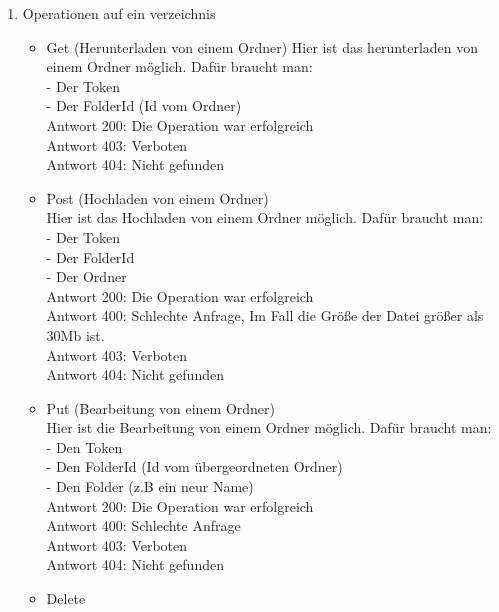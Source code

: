 \begin{enumerate}
\item Operationen auf ein verzeichnis
	\begin{itemize}
	\item Get (Herunterladen von einem Ordner)
Hier ist das herunterladen von einem Ordner m\"oglich. Daf\"ur braucht man: \\
	- Der Token \\
	- Der FolderId (Id vom  Ordner) \\
Antwort 200: Die Operation war erfolgreich \\ 
Antwort 403: Verboten \\
Antwort 404: Nicht gefunden
	\item Post (Hochladen von einem Ordner) \\
Hier ist das Hochladen von einem Ordner m\"oglich. Daf\"ur braucht man: \\
	- Der Token \\
	- Der FolderId \\
	- Der Ordner\\
Antwort 200: Die Operation war erfolgreich \\ 
Antwort 400: Schlechte Anfrage, Im Fall die Gr\"o{\ss}e der Datei gr\"o{\ss}er als 30Mb ist. \\
Antwort 403: Verboten \\
Antwort 404: Nicht gefunden
	\item Put (Bearbeitung von einem Ordner) \\
Hier ist die Bearbeitung von einem Ordner m\"oglich. Daf\"ur braucht man: \\
	- Den Token \\
	- Den FolderId (Id vom \"ubergeordneten Ordner) \\
	- Den Folder (z.B ein neur Name) \\
Antwort 200: Die Operation war erfolgreich \\ 
Antwort 400: Schlechte Anfrage \\
Antwort 403: Verboten \\
Antwort 404: Nicht gefunden
	\item Delete
	\end{itemize}
\end{enumerate}